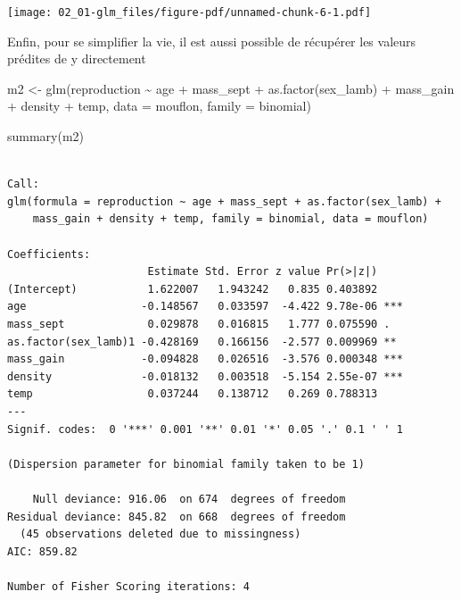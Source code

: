 \documentclass[
  letterpaper,
  DIV=11,
  numbers=noendperiod]{scrreprt}
\newenvironment{Shaded}{\begin{snugshade}}{\end{snugshade}}
\newcommand{\AttributeTok}[1]{\textcolor[rgb]{0.40,0.45,0.13}{#1}}
\newcommand{\DecValTok}[1]{\textcolor[rgb]{0.68,0.00,0.00}{#1}}
\newcommand{\FunctionTok}[1]{\textcolor[rgb]{0.28,0.35,0.67}{#1}}
\newcommand{\NormalTok}[1]{\textcolor[rgb]{0.00,0.23,0.31}{#1}}
\newcommand{\OtherTok}[1]{\textcolor[rgb]{0.00,0.23,0.31}{#1}}
\newcommand{\SpecialCharTok}[1]{\textcolor[rgb]{0.37,0.37,0.37}{#1}}
\newcommand{\StringTok}[1]{\textcolor[rgb]{0.13,0.47,0.30}{#1}}
\begin{document}
\texttt{[image: 02\_01-glm\_files/figure-pdf/unnamed-chunk-6-1.pdf]}

Enfin, pour se simplifier la vie, il est aussi possible de récupérer les
valeurs prédites de y directement

\begin{Shaded}
\end{Shaded}

\begin{Shaded}
\begin{Highlighting}[]
\NormalTok{m2 }\OtherTok{\textless{}{-}} \FunctionTok{glm}\NormalTok{(reproduction }\SpecialCharTok{\textasciitilde{}}\NormalTok{ age }\SpecialCharTok{+}\NormalTok{ mass\_sept }\SpecialCharTok{+} \FunctionTok{as.factor}\NormalTok{(sex\_lamb) }\SpecialCharTok{+}\NormalTok{ mass\_gain }\SpecialCharTok{+}\NormalTok{ density }\SpecialCharTok{+}\NormalTok{ temp,}
    \AttributeTok{data =}\NormalTok{ mouflon,}
    \AttributeTok{family =}\NormalTok{ binomial)}

\FunctionTok{summary}\NormalTok{(m2)}
\end{Highlighting}
\end{Shaded}

\begin{verbatim}

Call:
glm(formula = reproduction ~ age + mass_sept + as.factor(sex_lamb) + 
    mass_gain + density + temp, family = binomial, data = mouflon)

Coefficients:
                      Estimate Std. Error z value Pr(>|z|)    
(Intercept)           1.622007   1.943242   0.835 0.403892    
age                  -0.148567   0.033597  -4.422 9.78e-06 ***
mass_sept             0.029878   0.016815   1.777 0.075590 .  
as.factor(sex_lamb)1 -0.428169   0.166156  -2.577 0.009969 ** 
mass_gain            -0.094828   0.026516  -3.576 0.000348 ***
density              -0.018132   0.003518  -5.154 2.55e-07 ***
temp                  0.037244   0.138712   0.269 0.788313    
---
Signif. codes:  0 '***' 0.001 '**' 0.01 '*' 0.05 '.' 0.1 ' ' 1

(Dispersion parameter for binomial family taken to be 1)

    Null deviance: 916.06  on 674  degrees of freedom
Residual deviance: 845.82  on 668  degrees of freedom
  (45 observations deleted due to missingness)
AIC: 859.82

Number of Fisher Scoring iterations: 4
\end{verbatim}
\end{document}
